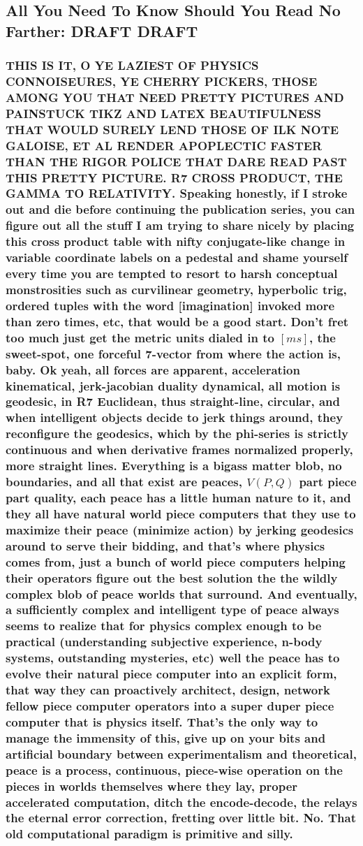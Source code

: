 \documentclass{article}
\begin{document}
\subsection*{All You Need To Know Should You Read No Farther: DRAFT DRAFT}
\subsubsection*{\tiny THIS IS IT, O YE LAZIEST OF PHYSICS CONNOISEURES, YE CHERRY PICKERS, THOSE AMONG YOU THAT NEED PRETTY PICTURES AND PAINSTUCK TIKZ AND LATEX BEAUTIFULNESS THAT WOULD SURELY LEND THOSE OF ILK NOTE GALOISE, ET AL RENDER APOPLECTIC FASTER THAN THE RIGOR POLICE THAT DARE READ PAST THIS PRETTY PICTURE. R7 CROSS PRODUCT, THE GAMMA TO RELATIVITY.
\noindent \tiny Speaking honestly, if I stroke out and die before continuing the publication series, you can figure out all the stuff I am trying to share nicely by placing this cross product table with nifty conjugate-like change in variable coordinate labels on a pedestal and shame yourself every time you are tempted to resort to harsh conceptual monstrosities such as curvilinear geometry, hyperbolic trig, ordered tuples with the word [imagination] invoked more than zero times, etc, that would be a good start. Don't fret too much just get the metric units dialed in to $[ms]$, the sweet-spot, one forceful 7-vector from where the action is, baby. Ok yeah, all forces are apparent, acceleration kinematical, jerk-jacobian duality dynamical, all motion is geodesic, in R7 Euclidean, thus straight-line, circular, and when intelligent objects decide to jerk things around, they reconfigure the geodesics, which by the phi-series is strictly continuous and when derivative frames normalized properly, more straight lines. Everything is a bigass matter blob, no boundaries, and all that exist are peaces, $V(P,Q)$ part piece part quality, each peace has a little human nature to it, and they all have natural world piece computers that they use to maximize their peace (minimize action) by jerking geodesics around to serve their bidding, and that's where physics comes from, just a bunch of world piece computers helping their operators figure out the best solution the the wildly complex blob of peace worlds that surround. And eventually, a sufficiently complex and intelligent type of peace always seems to realize that for physics complex enough to be practical (understanding subjective experience, n-body systems, outstanding mysteries, etc) well the peace has to evolve their natural piece computer into an explicit form, that way they can proactively architect, design, network fellow piece computer operators into a super duper piece computer that is physics itself. That's the only way to manage the immensity of this, give up on your bits and artificial boundary between experimentalism and theoretical, peace is a process, continuous, piece-wise operation on the pieces in worlds themselves where they lay, proper accelerated computation, ditch the encode-decode, the relays the eternal error correction, fretting over little bit. No. That old computational paradigm is primitive and silly.
}
\end{document}
